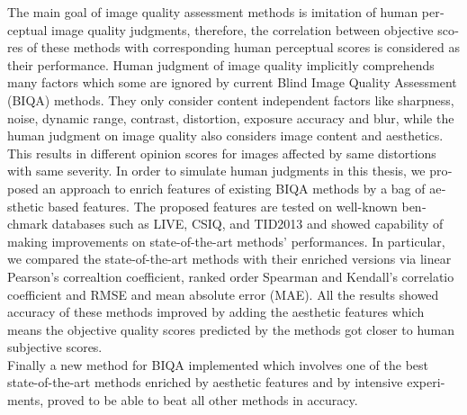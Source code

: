 \begin{latin}
{\noindent
The main goal of image quality assessment methods is imitation of human perceptual image quality judgments, therefore, the correlation between objective scores of these methods with corresponding human perceptual scores is considered as their performance. Human judgment of image quality implicitly comprehends many factors which some are ignored by current Blind Image Quality Assessment (BIQA) methods. They only consider content independent factors like sharpness, noise, dynamic range, contrast, distortion, exposure accuracy and blur, while the human judgment on image quality also considers image content and aesthetics. This results in different opinion scores for images affected by same distortions with same severity. In order to simulate human judgments in this thesis, we proposed an approach to enrich features of existing BIQA methods by a bag of aesthetic based features. The proposed features are tested on well-known benchmark databases such as LIVE, CSIQ, and TID2013 and showed capability of making improvements on state-of-the-art methods' performances. In particular, we compared the state-of-the-art methods with their enriched versions via linear Pearson's correaltion coefficient, ranked order Spearman and Kendall's correlatio coefficient and RMSE and mean absolute error (MAE). All the results showed accuracy of these methods improved by adding the aesthetic features which means the objective quality scores predicted by the methods got closer to human subjective scores.
\\
Finally a new method for BIQA implemented which involves one of the best state-of-the-art methods enriched by aesthetic features and by intensive experiments, proved to be able to beat all other methods in accuracy.
}
\newpage

\end{latin}
